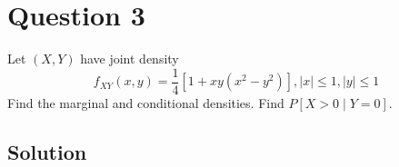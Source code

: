 \section*{Question 3}

Let \( (X, Y) \) have joint density
\begin{equation*}
    f_{X Y}(x, y)=\frac{1}{4}\left[1+x y\left(x^{2}-y^{2}\right)\right],|x| \leq 1,|y| \leq 1
\end{equation*}
Find the marginal and conditional densities.
Find \( P[X>0 \mid Y=0] \).

\subsection*{Solution}

